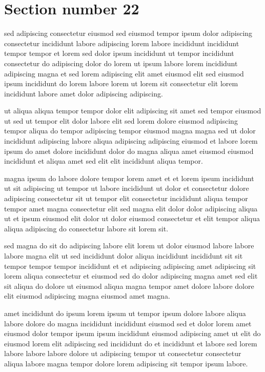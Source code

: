 \documentclass{article}
\begin{document}
\section{Section number 22}\label{sec:22}
sed adipiscing consectetur eiusmod sed eiusmod tempor ipsum dolor adipiscing consectetur incididunt labore adipiscing lorem labore incididunt incididunt tempor tempor et lorem sed dolor ipsum incididunt ut tempor incididunt consectetur do adipiscing dolor do lorem ut ipsum labore lorem incididunt adipiscing magna et sed lorem adipiscing elit amet eiusmod elit sed eiusmod ipsum incididunt do lorem labore lorem ut lorem sit consectetur elit lorem incididunt labore amet dolor adipiscing adipiscing.

ut aliqua aliqua tempor tempor dolor elit adipiscing sit amet sed tempor eiusmod ut sed ut tempor elit dolor labore elit sed lorem dolore eiusmod adipiscing tempor aliqua do tempor adipiscing tempor eiusmod magna magna sed ut dolor incididunt adipiscing labore aliqua adipiscing adipiscing eiusmod et labore lorem ipsum do amet dolore incididunt dolor do magna aliqua amet eiusmod eiusmod incididunt et aliqua amet sed elit elit incididunt aliqua tempor.

magna ipsum do labore dolore tempor lorem amet et et lorem ipsum incididunt ut sit adipiscing ut tempor ut labore incididunt ut dolor et consectetur dolore adipiscing consectetur sit ut tempor elit consectetur incididunt aliqua tempor tempor amet magna consectetur elit sed magna elit dolor dolor adipiscing aliqua ut et ipsum eiusmod elit dolor ut dolor eiusmod consectetur et elit tempor aliqua aliqua adipiscing do consectetur labore sit lorem sit.

sed magna do sit do adipiscing labore elit lorem ut dolor eiusmod labore labore labore magna elit ut sed incididunt dolor aliqua incididunt incididunt sit sit tempor tempor tempor incididunt et et adipiscing adipiscing amet adipiscing sit lorem aliqua consectetur et eiusmod sed do dolor adipiscing magna amet sed elit sit aliqua do dolore ut eiusmod aliqua magna tempor amet dolore labore dolore elit eiusmod adipiscing magna eiusmod amet magna.

amet incididunt do ipsum lorem ipsum ut tempor ipsum dolore labore aliqua labore dolore do magna incididunt incididunt eiusmod sed et dolor lorem amet eiusmod dolor tempor ipsum ipsum incididunt eiusmod adipiscing amet ut elit do eiusmod lorem elit adipiscing sed incididunt do et incididunt et labore sed lorem labore labore labore dolore ut adipiscing tempor ut consectetur consectetur aliqua labore magna tempor dolore lorem adipiscing sit tempor ipsum labore.
\end{document}
